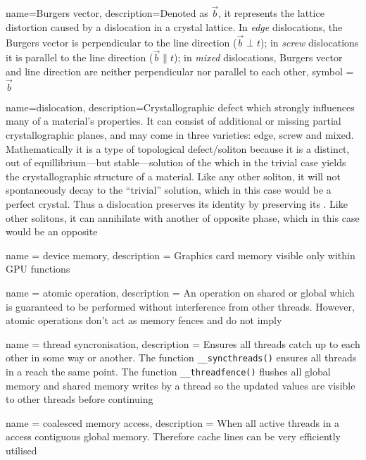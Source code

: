 {
	name={Burgers vector},
	description={Denoted as $\vec{b}$, it represents the lattice distortion caused by a dislocation in a crystal lattice. In \emph{edge} dislocations, the Burgers vector is perpendicular to the line direction ($ \vec{b} \perp t $); in \emph{screw} dislocations it is parallel to the line direction ($ \vec{b} \parallel t $); in \emph{mixed} dislocations, Burgers vector and line direction are neither perpendicular nor parallel to each other},
	symbol = {\ensuremath{\vec{b}}}
}

{
	name={dislocation},
	description={Crystallographic defect which strongly influences many of a material's properties. It can consist of additional or missing partial crystallographic planes, and may come in three varieties: edge, screw and mixed. Mathematically it is a type of topological defect/soliton because it is a distinct, out of equillibrium---but stable---solution of the  which in the trivial case yields the crystallographic structure of a material. Like any other soliton, it will not spontaneously decay to the ``trivial'' solution, which in this case would be a perfect crystal. Thus a dislocation preserves its identity by preserving its . Like other solitons, it can annihilate with another of opposite phase, which in this case would be an opposite }
}

{
	name = {device memory},
	description = {Graphics card memory visible only within GPU functions}
}

{
	name = {atomic operation},
	description = {An operation on shared or global  which is guaranteed to be performed without interference from other threads. However, atomic operations don't act as memory fences and do not imply  \cite{nvidia_atomics}}
}

{
	name = {thread syncronisation},
	description = {Ensures all threads catch up to each other in some way or another. The function \texttt{__syncthreads()} ensures all threads in a  reach the same point. The function \texttt{__threadfence()} flushes all global memory and shared memory writes by a thread so the updated values are visible to other threads before continuing}
}

{
	name = {coalesced memory access},
	description = {When all active threads in a  access contiguous global memory. Therefore cache lines can be very efficiently utilised}
}

